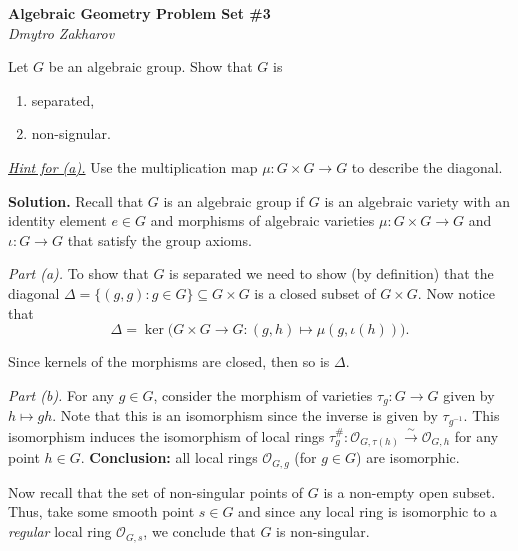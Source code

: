 \documentclass{template}
\begin{document}
\begin{center}
    \Large \textcolor{blue!70!black}{\textbf{Algebraic Geometry Problem Set \#3}} \\
    \normalsize \textit{Dmytro Zakharov}
\end{center}

\begin{problem}[Exercise 1]
    Let $G$ be an algebraic group. Show that $G$ is
    \begin{enumerate}
        \item[(a)] separated,
        \item[(b)] non-signular. 
    \end{enumerate}

    \underline{\textit{Hint for (a).}} Use the multiplication map $\mu: G \times G \to G$ to describe the diagonal.
\end{problem}

\textbf{Solution.} Recall that $G$ is an algebraic group if $G$ is an algebraic
variety with an identity element $e \in G$ and morphisms of algebraic varieties
$\mu: G \times G \to G$ and $\iota: G \to G$ that satisfy the group axioms. 

\textcolor{blue!70!black}{\textit{Part (a).}} To show that $G$ is separated we need to show (by definition)
that the diagonal $\Delta = \{(g,g): g \in G\} \subseteq G \times G$ is a closed
subset of $G \times G$. Now notice that 
\begin{equation*}
    \Delta = \ker\Big(G \times G \to G: (g,h) \mapsto \mu(g,\iota(h))\Big).
\end{equation*}

Since kernels of the morphisms are closed, then so is $\Delta$.

\textcolor{blue!70!black}{\textit{Part (b).}} For any $g \in G$, consider the morphism of varieties
$\tau_g: G \to G$ given by $h \mapsto gh$. Note that this is an isomorphism
since the inverse is given by $\tau_{g^{-1}}$. This isomorphism induces the
isomorphism of local rings $\tau_g^{\#}: \mathcal{O}_{G,\tau(h)}
\xrightarrow{\sim} \mathcal{O}_{G,h}$ for any point $h \in G$. \textbf{Conclusion:} 
all local rings $\mathcal{O}_{G,g}$ (for $g \in G$) are isomorphic. 

Now recall that the set of non-singular points of $G$ is a non-empty open 
subset. Thus, take some smooth point $s \in G$ and since any local ring is 
isomorphic to a \textit{regular} local ring $\mathcal{O}_{G,s}$, we 
conclude that $G$ is non-singular. 
\end{document}
